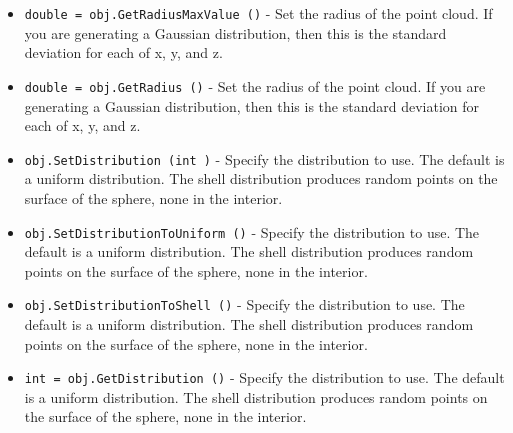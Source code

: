 \begin{itemize}
\item  \verb|double = obj.GetRadiusMaxValue ()| -  Set the radius of the point cloud.  If you are
 generating a Gaussian distribution, then this is
 the standard deviation for each of x, y, and z.

\item  \verb|double = obj.GetRadius ()| -  Set the radius of the point cloud.  If you are
 generating a Gaussian distribution, then this is
 the standard deviation for each of x, y, and z.

\item  \verb|obj.SetDistribution (int )| -  Specify the distribution to use.  The default is a
 uniform distribution.  The shell distribution produces
 random points on the surface of the sphere, none in the interior.

\item  \verb|obj.SetDistributionToUniform ()| -  Specify the distribution to use.  The default is a
 uniform distribution.  The shell distribution produces
 random points on the surface of the sphere, none in the interior.

\item  \verb|obj.SetDistributionToShell ()| -  Specify the distribution to use.  The default is a
 uniform distribution.  The shell distribution produces
 random points on the surface of the sphere, none in the interior.

\item  \verb|int = obj.GetDistribution ()| -  Specify the distribution to use.  The default is a
 uniform distribution.  The shell distribution produces
 random points on the surface of the sphere, none in the interior.

\end{itemize}
